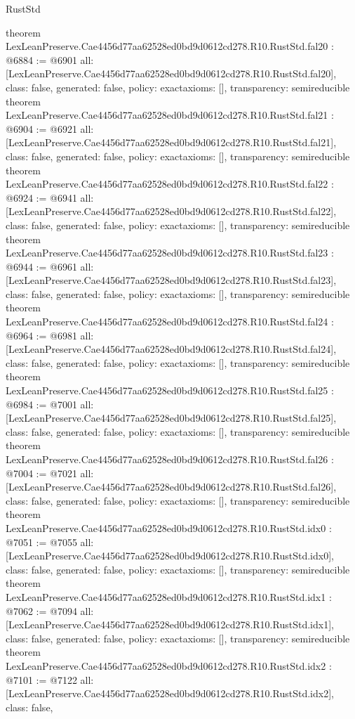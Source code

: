 \begin{lexlean}{RustStd}
\begin{coremodule}
{}
theorem LexLeanPreserve.Cae4456d77aa62528ed0bd9d0612cd278.R10.RustStd.fal20 : @6884 := @6901 {
  all: [LexLeanPreserve.Cae4456d77aa62528ed0bd9d0612cd278.R10.RustStd.fal20],
  class: false,
  generated: false,
  policy: exact{axioms: []},
  transparency: semireducible
}
theorem LexLeanPreserve.Cae4456d77aa62528ed0bd9d0612cd278.R10.RustStd.fal21 : @6904 := @6921 {
  all: [LexLeanPreserve.Cae4456d77aa62528ed0bd9d0612cd278.R10.RustStd.fal21],
  class: false,
  generated: false,
  policy: exact{axioms: []},
  transparency: semireducible
}
theorem LexLeanPreserve.Cae4456d77aa62528ed0bd9d0612cd278.R10.RustStd.fal22 : @6924 := @6941 {
  all: [LexLeanPreserve.Cae4456d77aa62528ed0bd9d0612cd278.R10.RustStd.fal22],
  class: false,
  generated: false,
  policy: exact{axioms: []},
  transparency: semireducible
}
theorem LexLeanPreserve.Cae4456d77aa62528ed0bd9d0612cd278.R10.RustStd.fal23 : @6944 := @6961 {
  all: [LexLeanPreserve.Cae4456d77aa62528ed0bd9d0612cd278.R10.RustStd.fal23],
  class: false,
  generated: false,
  policy: exact{axioms: []},
  transparency: semireducible
}
theorem LexLeanPreserve.Cae4456d77aa62528ed0bd9d0612cd278.R10.RustStd.fal24 : @6964 := @6981 {
  all: [LexLeanPreserve.Cae4456d77aa62528ed0bd9d0612cd278.R10.RustStd.fal24],
  class: false,
  generated: false,
  policy: exact{axioms: []},
  transparency: semireducible
}
theorem LexLeanPreserve.Cae4456d77aa62528ed0bd9d0612cd278.R10.RustStd.fal25 : @6984 := @7001 {
  all: [LexLeanPreserve.Cae4456d77aa62528ed0bd9d0612cd278.R10.RustStd.fal25],
  class: false,
  generated: false,
  policy: exact{axioms: []},
  transparency: semireducible
}
theorem LexLeanPreserve.Cae4456d77aa62528ed0bd9d0612cd278.R10.RustStd.fal26 : @7004 := @7021 {
  all: [LexLeanPreserve.Cae4456d77aa62528ed0bd9d0612cd278.R10.RustStd.fal26],
  class: false,
  generated: false,
  policy: exact{axioms: []},
  transparency: semireducible
}
theorem LexLeanPreserve.Cae4456d77aa62528ed0bd9d0612cd278.R10.RustStd.idx0 : @7051 := @7055 {
  all: [LexLeanPreserve.Cae4456d77aa62528ed0bd9d0612cd278.R10.RustStd.idx0],
  class: false,
  generated: false,
  policy: exact{axioms: []},
  transparency: semireducible
}
theorem LexLeanPreserve.Cae4456d77aa62528ed0bd9d0612cd278.R10.RustStd.idx1 : @7062 := @7094 {
  all: [LexLeanPreserve.Cae4456d77aa62528ed0bd9d0612cd278.R10.RustStd.idx1],
  class: false,
  generated: false,
  policy: exact{axioms: []},
  transparency: semireducible
}
theorem LexLeanPreserve.Cae4456d77aa62528ed0bd9d0612cd278.R10.RustStd.idx2 : @7101 := @7122 {
  all: [LexLeanPreserve.Cae4456d77aa62528ed0bd9d0612cd278.R10.RustStd.idx2],
  class: false,
}
\end{coremodule}
\end{lexlean}
